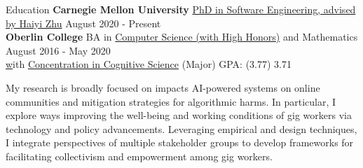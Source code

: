 \documentclass{resume}
\begin{document}
\begin{rSection}{Education}
{\bf Carnegie Mellon University}{ \href{https://se-phd.isri.cmu.edu/People/students/index.html}{PhD in Software Engineering}\href{https://haiyizhu.com/}{, advised by Haiyi Zhu}} \hfill { August 2020 - Present} \\ 
{\bf Oberlin College} {BA in \href{https://www.cs.oberlin.edu/}{Computer Science (with High Honors)}} and Mathematics \hfill { August 2016 - May 2020} \\
\href{https://www.oberlin.edu/arts-and-sciences/departments/mathematics}
with  \href{https://www.oberlin.edu/cognitive-sciences}{Concentration in Cognitive Science} \hfill {(Major) GPA: (3.77) 3.71} 


{My research is broadly focused on impacts AI-powered systems on online communities and mitigation strategies for algorithmic harms. 
In particular, I explore ways improving the well-being and working conditions of gig workers via technology and policy advancements. 
Leveraging empirical and design techniques, I integrate perspectives of multiple stakeholder groups to develop frameworks for facilitating collectivism and empowerment among gig workers.

}

\end{rSection}
\end{document}
